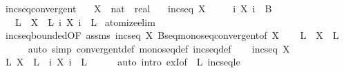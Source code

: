 \begin{isabellebody}
\endisatagproof
{\isafoldproof}%
%
\isadelimproof
\isanewline
%
\endisadelimproof
\isanewline
{}\isamarkupfalse%
\ incseq{\isacharunderscore}{\kern0pt}convergent{\isacharcolon}{\kern0pt}\isanewline
\ \ \ X\ {\isacharcolon}{\kern0pt}{\isacharcolon}{\kern0pt}\ {\isachardoublequoteopen}nat\ {\isasymRightarrow}\ real{\isachardoublequoteclose}\isanewline
\ \ \ {\isachardoublequoteopen}incseq\ X{\isachardoublequoteclose}\isanewline
\ \ \ \ \ {\isachardoublequoteopen}{\isasymforall}i{\isachardot}{\kern0pt}\ X\ i\ {\isasymle}\ B{\isachardoublequoteclose}\isanewline
\ \ \ L\ \ {\isachardoublequoteopen}X\ {\isasymlonglonglongrightarrow}\ L{\isachardoublequoteclose}\ {\isachardoublequoteopen}{\isasymforall}i{\isachardot}{\kern0pt}\ X\ i\ {\isasymle}\ L{\isachardoublequoteclose}\isanewline
%
\isadelimproof
%
\endisadelimproof
%
\isatagproof
{}\isamarkupfalse%
\ atomize{\isacharunderscore}{\kern0pt}elim\isanewline
\ \ \isamarkupfalse%
\ incseq{\isacharunderscore}{\kern0pt}bounded{\isacharbrackleft}{\kern0pt}OF\ assms{\isacharbrackright}{\kern0pt}\ {\isacartoucheopen}incseq\ X{\isacartoucheclose}\ Bseq{\isacharunderscore}{\kern0pt}monoseq{\isacharunderscore}{\kern0pt}convergent{\isacharbrackleft}{\kern0pt}of\ X{\isacharbrackright}{\kern0pt}\isanewline
\ \ \isamarkupfalse%
\ L\ \ {\isachardoublequoteopen}X\ {\isasymlonglonglongrightarrow}\ L{\isachardoublequoteclose}\isanewline
\ \ \ \ \isamarkupfalse%
\ {\isacharparenleft}{\kern0pt}auto\ simp{\isacharcolon}{\kern0pt}\ convergent{\isacharunderscore}{\kern0pt}def\ monoseq{\isacharunderscore}{\kern0pt}def\ incseq{\isacharunderscore}{\kern0pt}def{\isacharparenright}{\kern0pt}\isanewline
\ \ \isamarkupfalse%
\ {\isacartoucheopen}incseq\ X{\isacartoucheclose}\ \isamarkupfalse%
\ {\isachardoublequoteopen}{\isasymexists}L{\isachardot}{\kern0pt}\ X\ {\isasymlonglonglongrightarrow}\ L\ {\isasymand}\ {\isacharparenleft}{\kern0pt}{\isasymforall}i{\isachardot}{\kern0pt}\ X\ i\ {\isasymle}\ L{\isacharparenright}{\kern0pt}{\isachardoublequoteclose}\isanewline
\ \ \ \ \isamarkupfalse%
\ {\isacharparenleft}{\kern0pt}auto\ intro{\isacharbang}{\kern0pt}{\isacharcolon}{\kern0pt}\ exI{\isacharbrackleft}{\kern0pt}of\ {\isacharunderscore}{\kern0pt}\ L{\isacharbrackright}{\kern0pt}\ incseq{\isacharunderscore}{\kern0pt}le{\isacharparenright}{\kern0pt}\isanewline
{}\isamarkupfalse%
%
\endisatagproof

\end{isabellebody}
